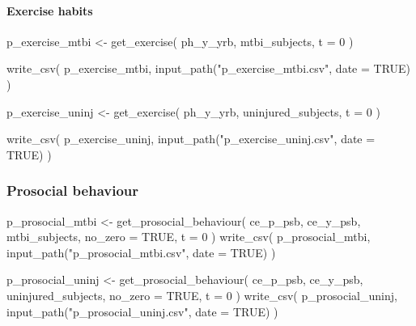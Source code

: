 \documentclass[
  letterpaper,
  DIV=11,
  numbers=noendperiod]{scrreprt}
\let\oldparagraph\paragraph
\renewcommand{\paragraph}[1]{\oldparagraph{#1}\mbox{}}
\newenvironment{Shaded}{\begin{snugshade}}{\end{snugshade}}
\newcommand{\AttributeTok}[1]{\textcolor[rgb]{0.40,0.45,0.13}{#1}}
\newcommand{\ConstantTok}[1]{\textcolor[rgb]{0.56,0.35,0.01}{#1}}
\newcommand{\DecValTok}[1]{\textcolor[rgb]{0.68,0.00,0.00}{#1}}
\newcommand{\FunctionTok}[1]{\textcolor[rgb]{0.28,0.35,0.67}{#1}}
\newcommand{\NormalTok}[1]{\textcolor[rgb]{0.00,0.23,0.31}{#1}}
\newcommand{\OtherTok}[1]{\textcolor[rgb]{0.00,0.23,0.31}{#1}}
\newcommand{\StringTok}[1]{\textcolor[rgb]{0.13,0.47,0.30}{#1}}
\begin{document}
\paragraph{Exercise habits}\label{exercise-habits}

\begin{Shaded}
\begin{Highlighting}[]
\NormalTok{p\_exercise\_mtbi }\OtherTok{\textless{}{-}} \FunctionTok{get\_exercise}\NormalTok{(}
\NormalTok{    ph\_y\_yrb,}
\NormalTok{    mtbi\_subjects,}
    \AttributeTok{t =} \DecValTok{0}
\NormalTok{)}

\FunctionTok{write\_csv}\NormalTok{(}
\NormalTok{    p\_exercise\_mtbi, }\FunctionTok{input\_path}\NormalTok{(}\StringTok{"p\_exercise\_mtbi.csv"}\NormalTok{, }\AttributeTok{date =} \ConstantTok{TRUE}\NormalTok{)}
\NormalTok{)}

\NormalTok{p\_exercise\_uninj }\OtherTok{\textless{}{-}} \FunctionTok{get\_exercise}\NormalTok{(}
\NormalTok{    ph\_y\_yrb,}
\NormalTok{    uninjured\_subjects,}
    \AttributeTok{t =} \DecValTok{0}
\NormalTok{)}

\FunctionTok{write\_csv}\NormalTok{(}
\NormalTok{    p\_exercise\_uninj, }\FunctionTok{input\_path}\NormalTok{(}\StringTok{"p\_exercise\_uninj.csv"}\NormalTok{, }\AttributeTok{date =} \ConstantTok{TRUE}\NormalTok{)}
\NormalTok{)}
\end{Highlighting}
\end{Shaded}

\subsubsection{Prosocial behaviour}\label{prosocial-behaviour}

\begin{Shaded}
\begin{Highlighting}[]
\NormalTok{p\_prosocial\_mtbi }\OtherTok{\textless{}{-}} \FunctionTok{get\_prosocial\_behaviour}\NormalTok{(}
\NormalTok{    ce\_p\_psb,}
\NormalTok{    ce\_y\_psb,}
\NormalTok{    mtbi\_subjects,}
    \AttributeTok{no\_zero =} \ConstantTok{TRUE}\NormalTok{,}
    \AttributeTok{t =} \DecValTok{0}
\NormalTok{)}
\FunctionTok{write\_csv}\NormalTok{(}
\NormalTok{    p\_prosocial\_mtbi, }\FunctionTok{input\_path}\NormalTok{(}\StringTok{"p\_prosocial\_mtbi.csv"}\NormalTok{, }\AttributeTok{date =} \ConstantTok{TRUE}\NormalTok{)}
\NormalTok{)}

\NormalTok{p\_prosocial\_uninj }\OtherTok{\textless{}{-}} \FunctionTok{get\_prosocial\_behaviour}\NormalTok{(}
\NormalTok{    ce\_p\_psb,}
\NormalTok{    ce\_y\_psb,}
\NormalTok{    uninjured\_subjects,}
    \AttributeTok{no\_zero =} \ConstantTok{TRUE}\NormalTok{,}
    \AttributeTok{t =} \DecValTok{0}
\NormalTok{)}
\FunctionTok{write\_csv}\NormalTok{(}
\NormalTok{    p\_prosocial\_uninj, }\FunctionTok{input\_path}\NormalTok{(}\StringTok{"p\_prosocial\_uninj.csv"}\NormalTok{, }\AttributeTok{date =} \ConstantTok{TRUE}\NormalTok{)}
\NormalTok{)}
\end{Highlighting}
\end{Shaded}
\end{document}
